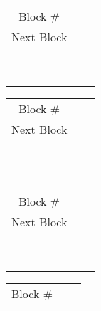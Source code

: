 \documentclass[a4paper,11pt]{exam}
\begin{document}
\begin{questions}
\begin{tabular}{|c|p{3.25em}|p{3.25em}|}
\hline
Block \# & & \\ \cline{1-3}
Next Block & & \\ \cline{1-3}
\multirow{5}{*}{} & & \\ \cline{2-3}
	& & \\ \cline{2-3}
	& & \\ \cline{2-3}
	& & \\ \cline{2-3}
	& & \\ \cline{2-3}
	& & \\ \cline{2-3}
	& & \\ \cline{2-3}
	& & \\ \cline{2-3}
	& & \\ \cline{1-3}
\end{tabular}
\begin{tabular}{|c|p{3.25em}|p{3.25em}|}
\hline
Block \# & & \\ \cline{1-3}
Next Block & & \\ \cline{1-3}
\multirow{5}{*}{} & & \\ \cline{2-3}
	& & \\ \cline{2-3}
	& & \\ \cline{2-3}
	& & \\ \cline{2-3}
	& & \\ \cline{2-3}
	& & \\ \cline{2-3}
	& & \\ \cline{2-3}
	& & \\ \cline{2-3}
	& & \\ \cline{1-3}
\end{tabular}
\begin{tabular}{|c|p{3.25em}|p{3.25em}|}
\hline
Block \# & & \\ \cline{1-3}
Next Block & & \\ \cline{1-3}
\multirow{5}{*}{} & & \\ \cline{2-3}
	& & \\ \cline{2-3}
	& & \\ \cline{2-3}
	& & \\ \cline{2-3}
	& & \\ \cline{2-3}
	& & \\ \cline{2-3}
	& & \\ \cline{2-3}
	& & \\ \cline{2-3}
	& & \\ \cline{1-3}
\end{tabular}
\begin{tabular}{|c|p{3.25em}|p{3.25em}|}
\hline
Block \# & & \\ \cline{1-3}

\end{tabular}
\end{questions}
\end{document}

